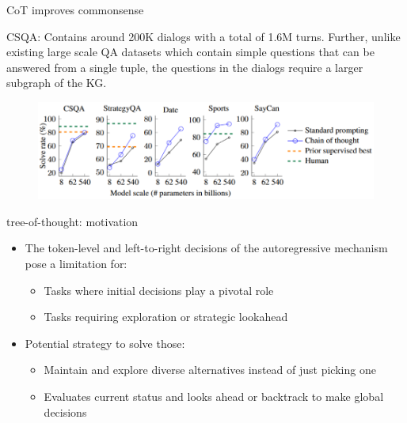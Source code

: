 
\begin{vbframe}{CoT improves commonsense}

\vfill

CSQA: Contains around 200K dialogs with a total of 1.6M
turns. Further, unlike existing large scale QA datasets
which contain simple questions that can be answered from a
single tuple, the questions in the dialogs require a larger
subgraph of the KG. 


\begin{figure}
    \centering
    \includegraphics{figure/cot_performance2.png}\\
\end{figure}

\vfill

\end{vbframe}


\begin{vbframe}{tree-of-thought: motivation}

\vfill

\begin{itemize}
\item The token-level and left-to-right decisions of the autoregressive mechanism pose a limitation for:
    \begin{itemize}
    \item Tasks where initial decisions play a pivotal role
    \item Tasks requiring exploration or strategic lookahead
    \end{itemize}
\item Potential strategy to solve those:
    \begin{itemize}
    \item Maintain and explore diverse alternatives instead of just picking one
    \item Evaluates current status and looks ahead or backtrack to make global decisions
    \end{itemize}

\end{itemize}

\vfill

\end{vbframe}

